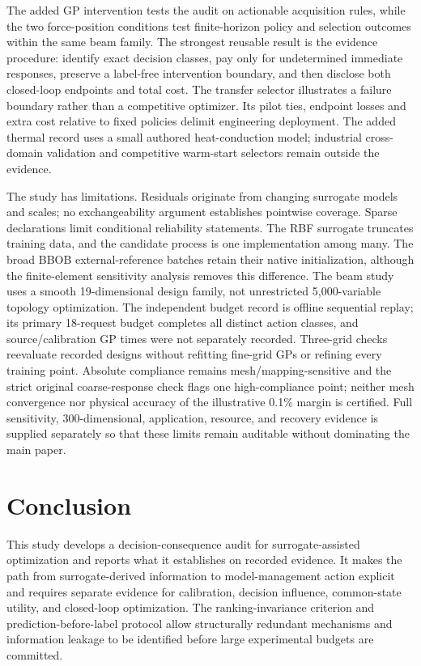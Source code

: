 \documentclass[]{interact}
\begin{document}
The added GP intervention tests the audit on actionable acquisition rules, while the two force-position conditions test finite-horizon policy and selection outcomes within the same beam family. The strongest reusable result is the evidence procedure: identify exact decision classes, pay only for undetermined immediate responses, preserve a label-free intervention boundary, and then disclose both closed-loop endpoints and total cost. The transfer selector illustrates a failure boundary rather than a competitive optimizer. Its pilot ties, endpoint losses and extra cost relative to fixed policies delimit engineering deployment. The added thermal record uses a small authored heat-conduction model; industrial cross-domain validation and competitive warm-start selectors remain outside the evidence.

The study has limitations. Residuals originate from changing surrogate models and scales; no exchangeability argument establishes pointwise coverage. Sparse declarations limit conditional reliability statements. The RBF surrogate truncates training data, and the candidate process is one implementation among many. The broad BBOB external-reference batches retain their native initialization, although the finite-element sensitivity analysis removes this difference. The beam study uses a smooth 19-dimensional design family, not unrestricted 5,000-variable topology optimization. The independent budget record is offline sequential replay; its primary 18-request budget completes all distinct action classes, and source/calibration GP times were not separately recorded. Three-grid checks reevaluate recorded designs without refitting fine-grid GPs or refining every training point. Absolute compliance remains mesh/mapping-sensitive and the strict original coarse-response check flags one high-compliance point; neither mesh convergence nor physical accuracy of the illustrative 0.1\% margin is certified. Full sensitivity, 300-dimensional, application, resource, and recovery evidence is supplied separately so that these limits remain auditable without dominating the main paper.

\hypertarget{conclusion}{%
\section{Conclusion}\label{conclusion}}

This study develops a decision-consequence audit for surrogate-assisted optimization and reports what it establishes on recorded evidence. It makes the path from surrogate-derived information to model-management action explicit and requires separate evidence for calibration, decision influence, common-state utility, and closed-loop optimization. The ranking-invariance criterion and prediction-before-label protocol allow structurally redundant mechanisms and information leakage to be identified before large experimental budgets are committed.
\end{document}
